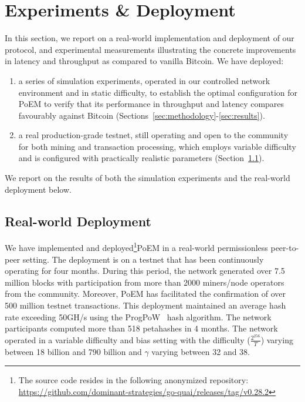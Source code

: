 \section{Experiments \& Deployment}\label{sec:experiments}

In this section, we report on a real-world implementation and deployment of our
protocol, and experimental measurements illustrating the concrete improvements
in latency and throughput as compared to vanilla Bitcoin. We have deployed:

\begin{enumerate}
\item a series of simulation experiments, operated in our controlled network
      environment and in static difficulty, to establish the optimal configuration
      for PoEM to verify that its performance in throughput and latency
      compares favourably against Bitcoin (Sections~\ref{sec:methodology}-\ref{sec:results}).

\item a real production-grade testnet, still operating and open to the community
      for both mining and transaction processing, which employs variable difficulty
      and is configured with practically realistic parameters (Section~\ref{sec:deployment}).
\end{enumerate}

We report on the results of both the simulation experiments and the real-world deployment below.

\subsection{Real-world Deployment}\label{sec:deployment}

We have implemented and deployed\ifanonymous\else\footnote{
    The source code resides in the following \ifanonymous anonymized \fi repository:
    \ifanonymous
    \else
        \url{https://github.com/dominant-strategies/go-quai/releases/tag/v0.28.2}
    \fi
}\fi PoEM in a real-world permissionless peer-to-peer
setting.
The deployment is on a testnet that has been continuously operating for
four months. During this period, the network generated over 7.5 million blocks
with participation from
more than 2000 miners/node operators from the community. Moreover, PoEM has facilitated the
confirmation of over 500 million testnet transactions. This deployment maintained an
average hash rate exceeding 50GH/s using the ProgPoW~\cite{progpow} hash algorithm.
The network participants computed more than 518 petahashes in 4 months.
The network operated in a variable difficulty and bias setting with the difficulty ($\frac{2^{256}}{T}$)
varying between 18 billion and 790 billion and $\gamma$ varying between 32 and 38.

